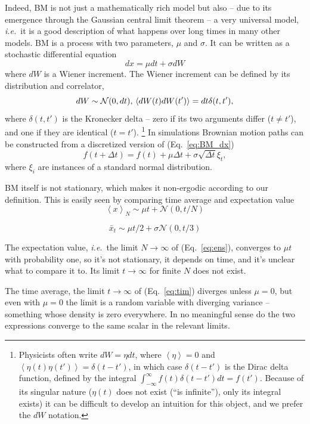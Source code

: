 \documentclass[a4paper]{article}
\newcommand{\ie}{{\it i.e.}\ }
\newcommand{\ave}[1]{\left\langle#1 \right\rangle}
\newcommand{\elabel}[1]{\label{eq:#1}}
\newcommand{\eref}[1]{(Eq.~\ref{eq:#1})}
\newcommand{\be}{\begin{equation}}
\newcommand{\ee}{\end{equation}}
\begin{document}
Indeed, BM is not just a mathematically rich model but also -- due to its emergence through the Gaussian 
central limit theorem -- a very universal model, \ie it is a good description of what happens over long times 
in many other models. BM is a process with two parameters, $\mu$ and $\sigma$.
It can be written as a stochastic differential equation
\be
dx=\mu dt + \sigma dW
\elabel{BM_dx}
\ee
where $dW$ is a Wiener increment. The Wiener increment can be defined by its distribution and correlator, 
\be
dW \sim \mathcal{N}(0,dt),\\
\ave{dW(t) dW(t')}=dt \delta(t,t'),
\ee
where $\delta(t,t')$ is the Kronecker delta -- zero if its two arguments differ ($t\neq t'$), and one if 
they are identical ($t=t'$).
\footnote{Physicists often write $dW=\eta dt$, where $\ave{\eta}=0$ and 
$\ave{\eta(t) \eta(t')}=\delta(t-t')$, in which case $\delta(t-t')$ is the Dirac 
delta function, defined by the integral $\int_{-\infty}^{\infty} f(t) \delta(t-t') dt=f(t')$. Because of its singular
nature ($\eta(t)$ does not exist (``is infinite''), only its integral exists) it can be difficult to develop
an intuition for this object, and we prefer the $dW$ notation. }
In simulations Brownian motion paths can be constructed from a discretized version of \eref{BM_dx}
\be
f(t+\Delta t)=f(t)+ \mu \Delta t + \sigma \sqrt{\Delta t} \xi_t,
\ee
where $\xi_i$ are instances of a standard normal distribution.

BM itself is not stationary, which makes it non-ergodic according to our definition. This is easily seen
by comparing time average and expectation value
\be
\ave{x}_N \sim \mu t+\mathcal{N}(0, t/N)
\elabel{ens}
\ee

\be
\bar{x}_t \sim \mu t/2 + \sigma \mathcal{N}(0, t/3)
\elabel{tim}
\ee

The expectation value, \ie the limit $N\to\infty$ of \eref{ens}, converges to $\mu t$ with probability 
one, so it's not stationary, it depends on time, and it's unclear what to compare it to. Its 
limit $t\to\infty$ for finite $N$ does not exist. 

The time average, the limit $t\to\infty $ of \eref{tim} diverges unless $\mu=0$, but even with 
$\mu=0$ the limit is a random variable with diverging variance -- something whose density 
is zero everywhere. In no meaningful sense do the two expressions converge to the same 
scalar in the relevant limits.
\end{document}

